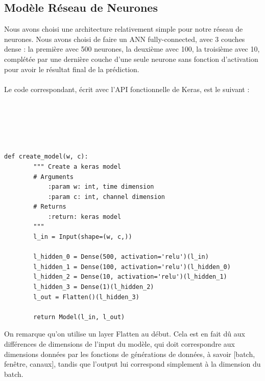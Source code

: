 \documentclass{article}
\begin{document}
    \subsection{Modèle Réseau de Neurones}
    Nous avons choisi une architecture relativement simple pour notre réseau de neurones. Nous avons choisi de faire un ANN fully-connected, avec 3 couches dense : la première avec 500 neurones, la deuxième avec 100, la troisième avec 10, complétée par une dernière couche d'une seule neurone sans fonction d'activation pour avoir le résultat final de la prédiction.\\\\Le code correspondant, écrit avec l'API fonctionnelle de Keras, est le suivant :\\\\\\\\\\\\
    \begin{lstlisting}[frame=single]
        def create_model(w, c):
        """ Create a keras model
        # Arguments
            :param w: int, time dimension
            :param c: int, channel dimension
        # Returns
            :return: keras model
        """
        l_in = Input(shape=(w, c,))  
        
        l_hidden_0 = Dense(500, activation='relu')(l_in)
        l_hidden_1 = Dense(100, activation='relu')(l_hidden_0)
        l_hidden_2 = Dense(10, activation='relu')(l_hidden_1)
        l_hidden_3 = Dense(1)(l_hidden_2)
        l_out = Flatten()(l_hidden_3)

        return Model(l_in, l_out)
    \end{lstlisting}

    On remarque qu'on utilise un layer Flatten au début. Cela est en fait dû aux différences de dimensions de l'input du modèle, qui doit correspondre aux dimensions données par les fonctions de générations de données, à savoir [batch, fenêtre, canaux], tandis que l'output lui correspond simplement à la dimension du batch.
\end{document}
